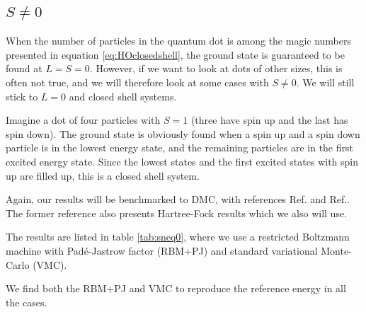 \subsection{$S\neq0$}
When the number of particles in the quantum dot is among the magic numbers presented in equation \eqref{eq:HOclosedshell}, the ground state is guaranteed to be found at $L=S=0$. However, if we want to look at dots of other sizes, this is often not true, and we will therefore look at some cases with $S\neq 0$. We will still stick to $L=0$ and closed shell systems.

Imagine a dot of four particles with $S=1$ (three have spin up and the last has spin down). The ground state is obviously found when a spin up and a spin down particle is in the lowest energy state, and the remaining particles are in the first excited energy state. Since the lowest states and the first excited states with spin up are filled up, this is a closed shell system.

Again, our results will be benchmarked to DMC, with references Ref.\cite{pederiva_diffusion_2000} and Ref.\cite{ghosal_incipient_2007}. The former reference also presents Hartree-Fock results which we also will use. 

The results are listed in table \eqref{tab:sneq0}, where we use a restricted Boltzmann machine with Padé-Jastrow factor (RBM+PJ) and standard variational Monte-Carlo (VMC). 

We find both the RBM+PJ and VMC to reproduce the reference energy in all the cases. 

